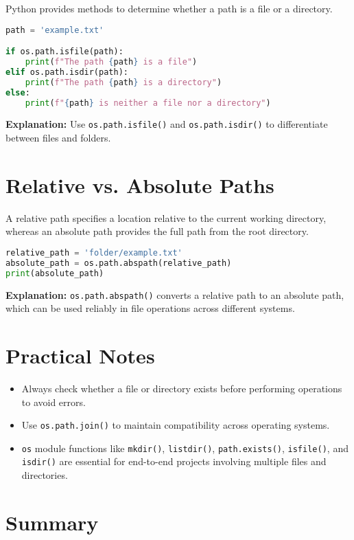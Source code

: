 Python provides methods to determine whether a path is a file or a directory.

\begin{lstlisting}[language=Python]
path = 'example.txt'

if os.path.isfile(path):
    print(f"The path {path} is a file")
elif os.path.isdir(path):
    print(f"The path {path} is a directory")
else:
    print(f"{path} is neither a file nor a directory")
\end{lstlisting}

\textbf{Explanation:} Use \texttt{os.path.isfile()} and \texttt{os.path.isdir()} to differentiate between files and folders.

\section{Relative vs. Absolute Paths}

A relative path specifies a location relative to the current working directory, whereas an absolute path provides the full path from the root directory.

\begin{lstlisting}[language=Python]
relative_path = 'folder/example.txt'
absolute_path = os.path.abspath(relative_path)
print(absolute_path)
\end{lstlisting}

\textbf{Explanation:} \texttt{os.path.abspath()} converts a relative path to an absolute path, which can be used reliably in file operations across different systems.

\section{Practical Notes}

\begin{itemize}
    \item Always check whether a file or directory exists before performing operations to avoid errors.
    \item Use \texttt{os.path.join()} to maintain compatibility across operating systems.
    \item \texttt{os} module functions like \texttt{mkdir()}, \texttt{listdir()}, \texttt{path.exists()}, \texttt{isfile()}, and \texttt{isdir()} are essential for end-to-end projects involving multiple files and directories.
\end{itemize}

\section{Summary}

